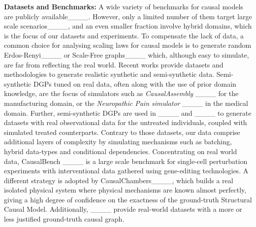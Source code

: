 \textbf{Datasets and Benchmarks:}
A wide variety of benchmarks for causal models are publicly available____.
However, only a limited number of them target large scale scenarios____, and an even smaller fraction involve hybrid domains, which is the focus of our datasets and experiments.
To compensate the lack of data, a common choice for analysing scaling laws for causal models is to generate random Erdos-Renyi____ or Scale-Free graphs____ which, although easy to simulate, are far from reflecting the real world. 
Recent works provide datasets and methodologies to generate realistic synthetic and semi-synthetic data. 
Semi-synthetic DGPs tuned on real data, often along with the use of prior domain knowledge, are the focus of simulators such as \textit{CausalAssembly} ____ for the manufacturing domain, or the \textit{Neuropathic Pain simulator} ____ in the medical domain. Further, semi-synthetic DGPs are used in ____ and ____ to generate datasets with real observational data for the untreated individuals, coupled with simulated treated counterparts.
Contrary to those datasets, our data comprise additional layers of complexity by simulating mechanisms such as batching, hybrid data-types and conditional dependencies.
Concentrating on real world data, CausalBench ____ is a large scale benchmark for single-cell perturbation experiments with interventional data gathered using gene-editing technologies. 
A different strategy is adopted by CausalChambers____, which builds a real isolated physical system where physical mechanisms are known almost perfectly, giving a high degree of confidence on the exactness of the ground-truth Structural Causal Model. Additionally, ____ provide real-world datasets with a more or less justified ground-truth causal graph.